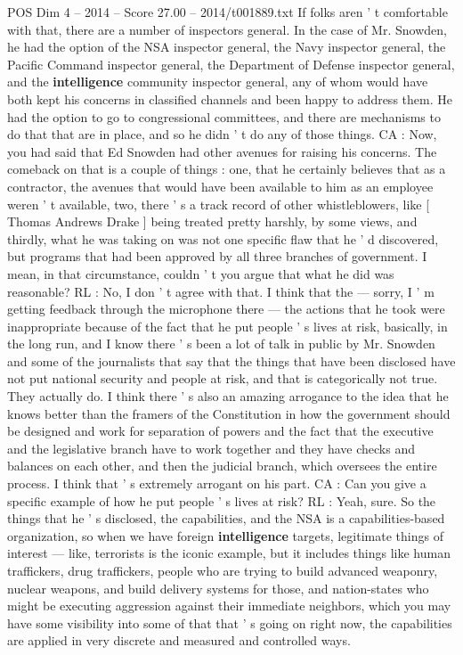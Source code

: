 \begin{textsample}{POS Dim 4 – 2014 – Score 27.00 – 2014/t001889.txt}
If folks aren ' t comfortable with that, there are a number of inspectors general.
In the case of Mr.
Snowden, he had the option of the NSA inspector general, the Navy inspector general, the Pacific Command inspector general, the Department of Defense inspector general, and the \textbf{intelligence} community inspector general, any of whom would have both kept his concerns in classified channels and been happy to address them.
He had the option to go to congressional committees, and there are mechanisms to do that that are in place, and so he didn ' t do any of those things.
CA : Now, you had said that Ed Snowden had other avenues for raising his concerns.
The comeback on that is a couple of things : one, that he certainly believes that as a contractor, the avenues that would have been available to him as an employee weren ' t available, two, there ' s a track record of other whistleblowers, like [ Thomas Andrews Drake ] being treated pretty harshly, by some views, and thirdly, what he was taking on was not one specific flaw that he ' d discovered, but programs that had been approved by all three branches of government.
I mean, in that circumstance, couldn ' t you argue that what he did was reasonable?
RL : No, I don ' t agree with that.
I think that the — sorry, I ' m getting feedback through the microphone there — the actions that he took were inappropriate because of the fact that he put people ' s lives at risk, basically, in the long run, and I know there ' s been a lot of talk in public by Mr.
Snowden and some of the journalists that say that the things that have been disclosed have not put national security and people at risk, and that is categorically not true.
They actually do.
I think there ' s also an amazing arrogance to the idea that he knows better than the framers of the Constitution in how the government should be designed and work for separation of powers and the fact that the executive and the legislative branch have to work together and they have checks and balances on each other, and then the judicial branch, which oversees the entire process.
I think that ' s extremely arrogant on his part.
CA : Can you give a specific example of how he put people ' s lives at risk?
RL : Yeah, sure.
So the things that he ' s disclosed, the capabilities, and the NSA is a capabilities-based organization, so when we have foreign \textbf{intelligence} targets, legitimate things of interest — like, terrorists is the iconic example, but it includes things like human traffickers, drug traffickers, people who are trying to build advanced weaponry, nuclear weapons, and build delivery systems for those, and nation-states who might be executing aggression against their immediate neighbors, which you may have some visibility into some of that that ' s going on right now, the capabilities are applied in very discrete and measured and controlled ways.

\end{textsample}
